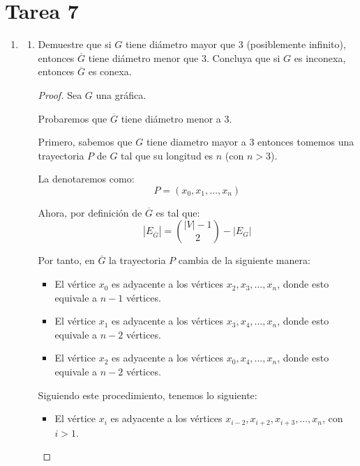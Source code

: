 \documentclass{article}
\begin{document}
\section*{\LARGE{Tarea 7}}
\begin{enumerate}
  \item \begin{enumerate}
    \item Demuestre que si $G$ tiene di\'ametro mayor que $3$ (posiblemente
      infinito), entonces $\overline{G}$ tiene di\'ametro menor que $3$.
      Concluya que si $G$ es inconexa, entonces $\overline{G}$ es conexa.

      \begin{proof}
        Sea $G$ una gráfica.

        Probaremos que $\overline{G}$ tiene diámetro menor a $3$.

        Primero, sabemos que $G$ tiene diametro mayor a $3$ entonces tomemos una trayectoria $P$ de $G$ tal que su longitud es $n$ (con $n > 3$).

        La denotaremos como:
        $$P = (x_{0}, x_{1}, \dots, x_{n})$$

        Ahora, por definición de $\overline{G}$ es tal que:
        $$|E_{\overline{G}}| = \binom{|V| - 1}{2} - |E_{G}|$$

        Por tanto, en $\overline{G}$ la trayectoria $P$ cambia de la siguiente manera:
        \begin{itemize}
          \item El vértice $x_{0}$ es adyacente a los vértices $x_{2}, x_{3}, \dots, x_{n}$, donde esto equivale a $n - 1$ vértices.

          \item El vértice $x_{1}$ es adyacente a los vértices $x_{3}, x_{4}, \dots, x_{n}$, donde esto equivale a $n - 2$ vértices.

          \item El vértice $x_{2}$ es adyacente a los vértices $x_{0}, x_{4}, \dots, x_{n}$, donde esto equivale a $n - 2$ vértices.
        \end{itemize}

        Siguiendo este procedimiento, tenemos lo siguiente:
        \begin{itemize}
          \item El vértice $x_{i}$ es adyacente a los vértices $x_{i-2}, x_{i+2}, x_{i+3}, \dots, x_{n}$, con $i > 1$. \\
        \end{itemize}


\end{proof}
\end{enumerate}
\end{enumerate}
\end{document}
